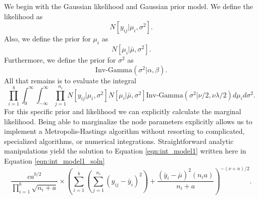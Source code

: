 \documentclass{article}
\begin{document}
We begin with the Gaussian likelihood and Gaussian prior model. We define the likelihood as 
\begin{equation}\label{eqn:norm_lhood1}
N[y_{ij} \vert \mu_i, \sigma^2].
\end{equation}
Also, we define the prior for $\mu_i$ as 
\begin{equation}\label{eqn:norm_prior1}
N[\mu_i\vert \bar{\mu}, \sigma^2 ].
\end{equation}
Furthermore, we define the prior for $\sigma^2$ as 
\begin{equation}
\text{Inv-Gamma}(\sigma^2\vert \alpha, \beta).
\end{equation}
All that remains is to evaluate the integral 
\begin{equation}\label{eqn:int_model1}
\prod_{i=1}^b \int_0^\infty \int_{-\infty}^{\infty} \prod_{j=1}^{n_i} N[y_{ij} \vert \mu_i, \sigma^2]N[\mu_i\vert \bar{\mu}, \sigma^2 ]\text{Inv-Gamma}(\sigma^2\vert \nu/2, \nu\lambda/2)d\mu_id\sigma^2.
\end{equation}
For this specific prior and likelihood we can explicitly calculate the marginal likelihood. Being able to marginalize the node parameters explicitly allows us to implement a Metropolis-Hastings algorithm without resorting to complicated, specialized algorithms, or numerical integrations. Straightforward analytic manipulations yield the solution to Equation \ref{eqn:int_model1} written here in Equation \ref{eqn:int_model1_soln}
\begin{equation}\label{eqn:int_model1_soln}
\frac{ca^{b/2}}{\prod_{i=1}^b\sqrt{n_i+a}}\times \left(\sum_{i=1}^b\left(\sum_{j=1}^{n_{i}}(y_{ij}-\bar{y}_i)^2\right)+ \frac{(\bar{y}_i -\bar{\mu})^2(n_ia)}{n_i+a} \right)^{-(\nu+n)/2}.
\end{equation}
\end{document}

